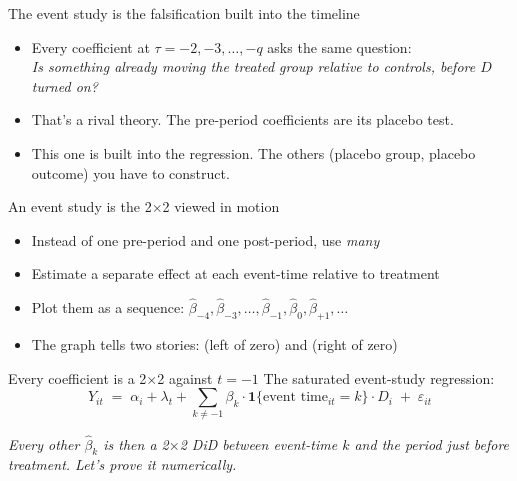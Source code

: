 \documentclass[aspectratio=169,11pt]{beamer}
\begin{document}
\begin{frame}{The event study is the falsification built into the timeline}
\vspace{0.5em}
\begin{itemize}
  \item Every coefficient at $\tau = -2, -3, \ldots, -q$ asks the same question: \\
  \textit{Is something already moving the treated group relative to controls, before $D$ turned on?}
  \item That's a rival theory. The pre-period coefficients are its placebo test.
  \item This one is built into the regression. The others (placebo group, placebo outcome) you have to construct.
\end{itemize}
\vspace{0.4em}
\end{frame}

\begin{frame}{An event study is the 2$\times$2 viewed in motion}
\vspace{0.6em}
\begin{itemize}
  \item Instead of one pre-period and one post-period, use \textit{many}
  \item Estimate a separate effect at each event-time relative to treatment
  \item Plot them as a sequence: $\hat{\beta}_{-4}, \hat{\beta}_{-3}, \ldots, \hat{\beta}_{-1}, \hat{\beta}_{0}, \hat{\beta}_{+1}, \ldots$
  \item The graph tells two stories:  (left of zero) and  (right of zero)
\end{itemize}
\end{frame}

\begin{frame}{Every coefficient is a 2$\times$2 against $t = -1$}
\vspace{0.6em}
The saturated event-study regression:
\vspace{0.2em}
\[
Y_{it} \;=\; \alpha_i + \lambda_t + \sum_{k \neq -1} \beta_k \cdot \mathbf{1}\{\text{event time}_{it} = k\} \cdot D_i \;+\; \varepsilon_{it}
\]

\vspace{0.8em}
\begin{center}
\Large {}
\end{center}

\vspace{0.4em}
\begin{center}
\small\color{warmgray}\itshape Every other $\hat\beta_k$ is then a 2$\times$2 DiD between event-time $k$ and the period just before treatment. \;Let's prove it numerically.
\end{center}
\end{frame}
\end{document}
